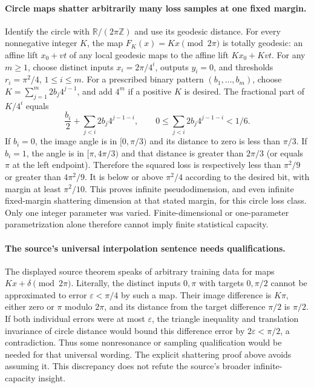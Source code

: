 \documentclass[11pt]{article}
\begin{document}
\paragraph{Circle maps shatter arbitrarily many loss samples at one fixed margin.}
Identify the circle with $\mathbb R/(2\pi\mathbb Z)$ and use its geodesic
distance. For every nonnegative integer $K$, the map
$F_K(x)=Kx\pmod{2\pi}$ is totally geodesic: an affine lift $x_0+vt$ of
any local geodesic maps to the affine lift $Kx_0+Kvt$.
For any $m\ge1$, choose distinct inputs $x_i=2\pi/4^i$, outputs $y_i=0$,
and thresholds $r_i=\pi^2/4$, $1\le i\le m$.
For a prescribed binary pattern $(b_1,\ldots,b_m)$, choose
$K=\sum_{j=1}^m2b_j4^{j-1}$, and add $4^m$ if a positive $K$ is desired.
The fractional part of $K/4^i$ equals
\[
\frac{b_i}{2}+\sum_{j<i}2b_j4^{j-1-i},
\qquad 0\le\sum_{j<i}2b_j4^{j-1-i}<1/6.
\]
If $b_i=0$, the image angle is in $[0,\pi/3)$ and its distance to zero
is less than $\pi/3$. If $b_i=1$, the angle is in $[\pi,4\pi/3)$
and that distance is greater than $2\pi/3$ (or equals $\pi$ at the
left endpoint). Therefore the squared loss is respectively less than
$\pi^2/9$ or greater than $4\pi^2/9$. It is below or above $\pi^2/4$
according to the desired bit, with margin at least $\pi^2/10$.
This proves infinite pseudodimension, and even infinite fixed-margin
shattering dimension at that stated margin, for this circle loss class.
Only one integer parameter was varied. Finite-dimensional or one-parameter
parametrization alone therefore cannot imply finite statistical capacity.

\paragraph{The source's universal interpolation sentence needs qualifications.}
The displayed source theorem speaks of arbitrary training data for maps
$Kx+\delta\pmod{2\pi}$. Literally, the distinct inputs $0,\pi$ with
targets $0,\pi/2$ cannot be approximated to error $\varepsilon<\pi/4$
by such a map. Their image difference is $K\pi$, either zero or $\pi$
modulo $2\pi$, and its distance from the target difference $\pi/2$ is
$\pi/2$. If both individual errors were at most $\varepsilon$, the
triangle inequality and translation invariance of circle distance would
bound this difference error by $2\varepsilon<\pi/2$, a contradiction.
Thus some nonresonance or sampling qualification would be needed for that
universal wording. The explicit shattering proof above avoids assuming it.
This discrepancy does not refute the source's broader infinite-capacity insight.
\end{document}
